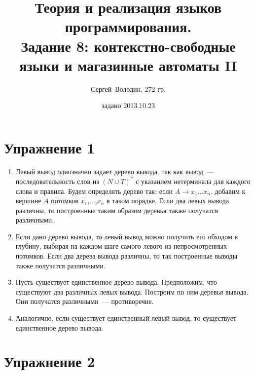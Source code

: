 \documentclass[a4paper]{article}
\title{Теория и реализация языков программирования.\\Задание 8: контекстно-свободные языки и магазинные автоматы II}
\date{задано 2013.10.23}
\author{Сергей~Володин, 272 гр.}
\begin{document}
\maketitle
\section*{Упражнение 1}
\begin{enumerate}
\item Левый вывод однозначно задает дерево вывода, так как вывод~--- последовательность слов из $(N\cup T)^*$ с указанием нетерминала для каждого слова и правила. Будем определять дерево так: если $A\longrightarrow x_1...x_n$. добавим к вершине $A$ потомков $x_1$,...,$x_n$ в таком порядке. Если два левых вывода различны, то построенные таким образом деревья также получатся различными.
\item Если дано дерево вывода, то левый вывод можно получить его обходом в глубину, выбирая на каждом шаге самого левого из непросмотренных потомков. Если два дерева вывода различны, то так построенные выводы также получатся различными.
\item Пусть существует единственное дерево вывода. Предположим, что существуют два различных левых вывода. Построим по ним деревья вывода. Они получатся различными~--- противоречие.
\item Аналогично, если существует единственный левый вывод, то существует единственное дерево вывода.
\end{enumerate}
\section*{Упражнение 2}
\end{document}

